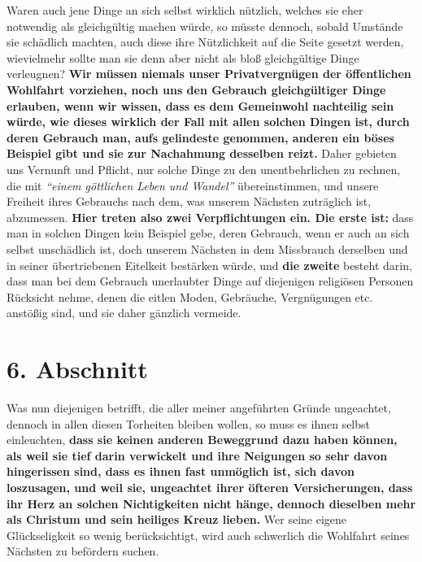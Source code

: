 Waren auch jene Dinge an sich selbst wirklich nützlich, welches sie eher
notwendig als gleichgültig machen würde, so müsste dennoch, sobald Umstände sie
schädlich machten, auch diese ihre Nützlichkeit auf die Seite gesetzt werden,
wievielmehr sollte man sie denn aber nicht als bloß gleichgültige Dinge
verleugnen? \textbf{Wir müssen niemals unser Privatvergnügen der öffentlichen
Wohlfahrt
vorziehen, noch uns den Gebrauch gleichgültiger Dinge erlauben, wenn wir wissen,
dass es dem Gemeinwohl nachteilig sein würde, wie dieses wirklich der Fall mit
allen solchen Dingen ist, durch deren Gebrauch man, aufs gelindeste genommen,
anderen ein böses Beispiel gibt und sie zur Nachahmung desselben reizt.} Daher
gebieten uns Vernunft und Pflicht, nur solche Dinge zu den unentbehrlichen zu
rechnen, die mit
\textit{"`einem göttlichen Leben und Wandel"'}
übereinstimmen, und unsere Freiheit ihres Gebrauchs nach dem, was unserem
Nächsten zuträglich ist, abzumessen. \textbf{Hier treten also zwei
Verpflichtungen ein.
Die erste ist:} dass man in solchen Dingen kein Beispiel gebe, deren Gebrauch,
wenn er auch an sich selbst unschädlich ist, doch unserem Nächsten in dem
Missbrauch derselben und in seiner übertriebenen Eitelkeit bestärken würde, und
\textbf{die zweite} besteht darin, dass man bei dem Gebrauch unerlaubter Dinge
auf
diejenigen religiösen Personen Rücksicht nehme, denen die eitlen Moden,
Gebräuche, Vergnügungen etc. anstößig sind, und sie daher gänzlich
vermeide.

\section{6. Abschnitt} \label{kap18_ab6}

Was nun diejenigen betrifft, die aller meiner angeführten Gründe ungeachtet,
dennoch in allen diesen Torheiten bleiben wollen, so muss es ihnen selbst
einleuchten, \textbf{dass sie keinen anderen Beweggrund dazu haben können, als
weil sie
tief darin verwickelt und ihre Neigungen so sehr davon hingerissen sind, dass es
ihnen fast unmöglich ist, sich davon loszusagen, und weil sie, ungeachtet ihrer
öfteren Versicherungen, dass ihr Herz an solchen Nichtigkeiten nicht hänge,
dennoch dieselben mehr als Christum und sein heiliges Kreuz
lieben.} Wer seine
eigene Glückseligkeit so wenig berücksichtigt, wird auch schwerlich die
Wohlfahrt seines Nächsten zu befördern suchen.

\medskip

